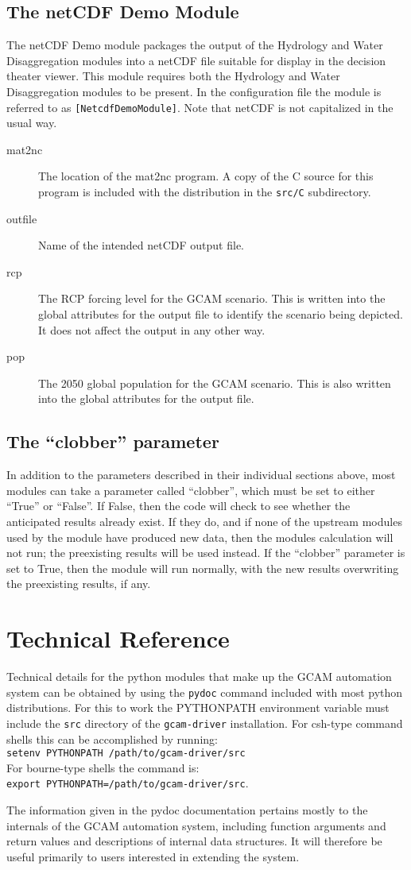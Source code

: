 \documentclass[11pt]{article}
\begin{document}
\subsection{The netCDF Demo Module}
The netCDF Demo module packages the output of the Hydrology and Water
Disaggregation modules into a netCDF file suitable for display in the
decision theater viewer.  This module requires both the Hydrology and
Water Disaggregation modules to be present.  In the configuration file
the module is referred to as \texttt{[NetcdfDemoModule]}.  Note that
netCDF is not capitalized in the usual way.

\begin{description}
\item[mat2nc] The location of the mat2nc program.  A copy of the C
  source for this program is included with the distribution in the
  \texttt{src/C} subdirectory.
\item[outfile] Name of the intended netCDF output file.
\item[rcp] The RCP forcing level for the GCAM scenario.  This is
  written into the global attributes for the output file to identify
  the scenario being depicted.  It does not affect the output in any
  other way.
\item[pop] The 2050 global population for the GCAM scenario.  This is
  also written into the global attributes for the output file.
\end{description}

\subsection{The ``clobber'' parameter}
In addition to the parameters described in their individual sections
above, most modules can take a parameter called ``clobber'', which
must be set to either ``True'' or ``False''.  If False, then the code
will check to see whether the anticipated results already exist.  If
they do, and if none of the upstream modules used by the module have
produced new data, then the modules calculation will not run; the
preexisting results will be used instead.  If the ``clobber''
parameter is set to True, then the module will run normally, with the
new results overwriting the preexisting results, if any.

\appendix
\section{Technical Reference}
Technical details for the python modules that make up the GCAM
automation system can be obtained by using the \texttt{pydoc} command
included with most python distributions.  For this to work the
PYTHONPATH environment variable must include the \texttt{src}
directory of the \texttt{gcam-driver} installation.  For csh-type
command shells this can be accomplished by running:\\ 
\texttt{setenv PYTHONPATH /path/to/gcam-driver/src}\\
For bourne-type shells the command is:\\
\texttt{export PYTHONPATH=/path/to/gcam-driver/src}.

The information given in the pydoc documentation pertains mostly to
the internals of the GCAM automation system, including function
arguments and return values and descriptions of internal data
structures.  It will therefore be useful primarily to users interested
in extending the system.
\end{document}
